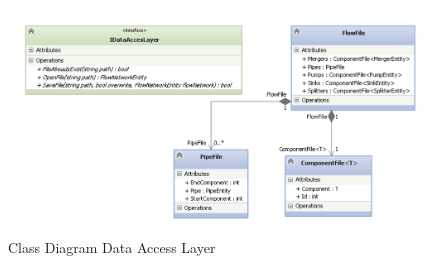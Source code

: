 \begin{figure}
	\centering
	\includegraphics[width=
	\textwidth]{figures/ClassDataAccess.pdf}
	\caption{Class Diagram Data Access Layer}
	\label{fig:dataaccess}
\end{figure}